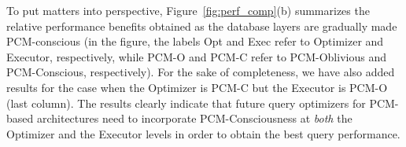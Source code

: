 To put matters into perspective, Figure~\ref{fig:perf_comp}(b) summarizes
the relative performance benefits obtained as the database layers are
gradually made PCM-conscious (in the figure, the labels Opt and Exec
refer to Optimizer and Executor, respectively, while PCM-O and PCM-C
refer to PCM-Oblivious and PCM-Conscious, respectively). For the sake of
completeness, we have also added results for the case when the Optimizer
is PCM-C but the Executor is PCM-O (last column). The results clearly
indicate that future query optimizers for PCM-based architectures need
to incorporate PCM-Consciousness at \emph{both} the Optimizer and the
Executor levels in order to obtain the best query performance. 


